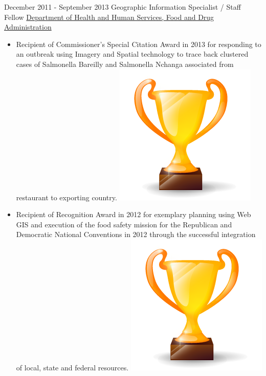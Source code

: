 \documentclass[letterpaper]{twentysecondcv} %
\begin{document}
\begin{twenty}
 \twentyitem
    	{December 2011 -}
		{September 2013}
        {Geographic Information Specialist / Staff Fellow  }        {\href{http://www.fda.gov/}{Department of Health and Human Services, Food and Drug Administration 
}}
        {}
        {
        {\begin{itemize}
        \item	Recipient of Commissioner’s Special Citation Award in 2013 for responding to an outbreak using Imagery and Spatial technology to trace back clustered cases of Salmonella Bareilly and Salmonella Nchanga associated from restaurant to exporting country.	\includegraphics[scale=0.05]{img/trophy.png}
\vspace{1mm}
\item	Recipient of Recognition Award in 2012 for exemplary planning using Web GIS  and execution of the food safety mission for the Republican and Democratic National Conventions in 2012 through the successful integration of local, state and federal resources. 	\includegraphics[scale=0.05]{img/trophy.png}
\vspace{1mm}

\end{itemize}}}
\end{twenty}
\end{document}
